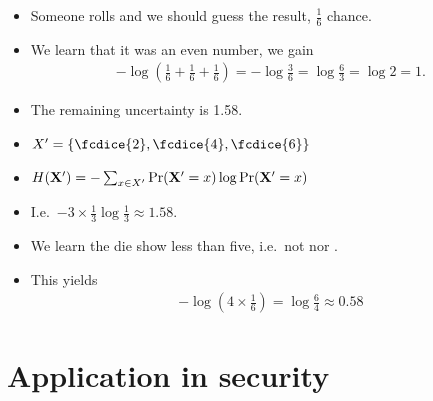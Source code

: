 \begin{frame}
  \begin{example}
    \begin{itemize}
      \item Someone rolls and we should guess the result, \(\frac{1}{6}\) 
        chance.
      \item We learn that it was an even number, we gain
        \begin{align*}
          -\log\left( \frac{1}{6} + \frac{1}{6} + \frac{1}{6}\right) =
          -\log\frac{3}{6} = \log\frac{6}{3} = \log 2 = 1.
        \end{align*}
      \item The remaining uncertainty is \SI{1.58}{\bit}.
    \end{itemize}
  \end{example}

  \pause{}

  \begin{remark}
    \begin{itemize}
      \item \(X' = \{\fcdice{2}, \fcdice{4}, \fcdice{6}\}\)
      \item \(H(\mathbf X') = - \sum_{x\in X'} \Pr(\mathbf X' = x)\log \Pr(\mathbf 
          X' = x)\)
      \item I.e.\ \(- 3 \times \frac{1}{3}\log\frac{1}{3} \approx 1.58\).
    \end{itemize}
  \end{remark}
\end{frame}

\begin{frame}
  \begin{example}
    \begin{itemize}
      \item We learn the die show less than five, i.e.\ not  nor 
        .
      \item This yields
        \begin{align*}
          -\log\left( 4\times\frac{1}{6}\right) = \log\frac{6}{4}\approx 0.58
        \end{align*}
    \end{itemize}
  \end{example}
\end{frame}


\section[Applications]{Application in security}

